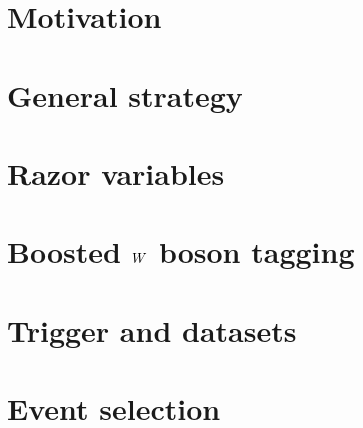 \vspace{2eM}

\section{Motivation \label{sec:boost_motivation}}




\section{General strategy \label{sec:boost_strategy}}




\section{Razor variables \label{sec:boost_razor}}




\section[Boosted W boson tagging]{Boosted $W$ boson tagging \label{sec:boost_wtag}}




\section{Trigger and datasets \label{sec:trigger_datasets}}




\section{Event selection \label{sec:boost_event_selection}}

